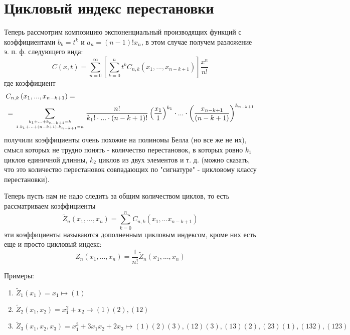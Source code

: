 \section{Цикловый индекс перестановки}

Теперь рассмотрим композицию экспоненциальный производящих функций с коэффициентами $b_k = t^k$ и $a_n = \left(n-1\right)!x_n$, в этом случае получем разложение э. п. ф. следующего вида:
\[
	C\left(x,t\right) = \sum_{n=0}^{\infty} \left[\sum_{k=0}^n t^k C_{n,k}\left(x_1,...,x_{n-k+1}\right)\right]\frac{x^n}{n!}
\]
где коэффициент
\[
	\begin{split}
		&C_{n,k}\left(x_1, ... , x_{n-k+1}\right) =\\
		& = \sum_{
			k_1 + ... + k_{n-k+1} = k
			\atop
			1\cdot k_1 + ... +\left(n-k+1\right)\cdot k_{n-k+1} = n
			} \frac{n!}{k_1!\cdot ... \cdot \left(n-k+1\right)!} \left(\frac{x_1}{1}\right)^{k_1}\cdot...\cdot\left(\frac{x_{n-k+1}}{\left(n-k+1\right)}\right)^{k_{n-k+1}}
	\end{split}
\]
получили коэффициенты очень похожие на полиномы Белла (но все же не их), смысл которых не трудно понять - количество перестановок, в которых ровно $k_1$ циклов единичной длинны, $k_2$ циклов из двух элементов и т. д. (можно сказать, что это количество перестановок совпадающих по "сигнатуре" - цикловому классу перестановки).

Теперь пусть нам не надо следить за общим количеством циклов, то есть рассматриваем коэффициенты
\[
	\tilde Z_n \left(x_1, ... , x_n\right) = \sum_{k=0}^n C_{n,k}\left(x_1, ... x_{n-k+1}\right)
\]
эти коэффициенты называются дополненным цикловым индексом, кроме них есть еще и просто цикловый индекс:
\[
	Z_n \left(x_1, ..., x_n\right) = \frac{1}{n!} \tilde Z_n \left(x_1, ..., x_n\right)
\]

Примеры:
\begin{enumerate}
\item $\tilde Z_1 \left(x_1\right) = x_1 \mapsto \left(1\right)$

\item $\tilde Z_2 \left(x_1,x_2\right) = x_1^2 + x_2 \mapsto \left(1\right)\left(2\right),\left(12\right)$

\item $\tilde Z_3 \left(x_1, x_2, x_3\right) = x_1^3 + 3x_1x_2 + 2x_3 \mapsto \left(1\right)\left(2\right)\left(3\right),\left(12\right)\left(3\right),\left(13\right)\left(2\right), \left(23\right)\left(1\right), \left(132\right),\left(123\right)$
\end{enumerate}

